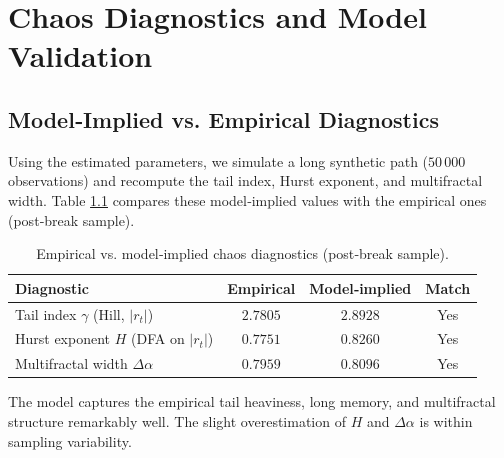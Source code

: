 \chapter{Chaos Diagnostics and Model Validation}

\section{Model‑Implied vs. Empirical Diagnostics}
Using the estimated parameters, we simulate a long synthetic path ($50\,000$ observations) and recompute the tail index, Hurst exponent, and multifractal width. Table \ref{tab:diag} compares these model‑implied values with the empirical ones (post‑break sample).

\begin{table}[H]
\centering
\caption{Empirical vs. model‑implied chaos diagnostics (post‑break sample).}
\label{tab:diag}
\begin{tabular}{l c c c}
\toprule
\textbf{Diagnostic} & \textbf{Empirical} & \textbf{Model‑implied} & \textbf{Match} \\
\midrule
Tail index $\gamma$ (Hill, $|r_t|$) & $2.7805$ & $2.8928$ & Yes \\
Hurst exponent $H$ (DFA on $|r_t|$) & $0.7751$ & $0.8260$ & Yes \\
Multifractal width $\Delta\alpha$ & $0.7959$ & $0.8096$ & Yes \\
\bottomrule
\end{tabular}
\end{table}

The model captures the empirical tail heaviness, long memory, and multifractal structure remarkably well. The slight overestimation of $H$ and $\Delta\alpha$ is within sampling variability.

